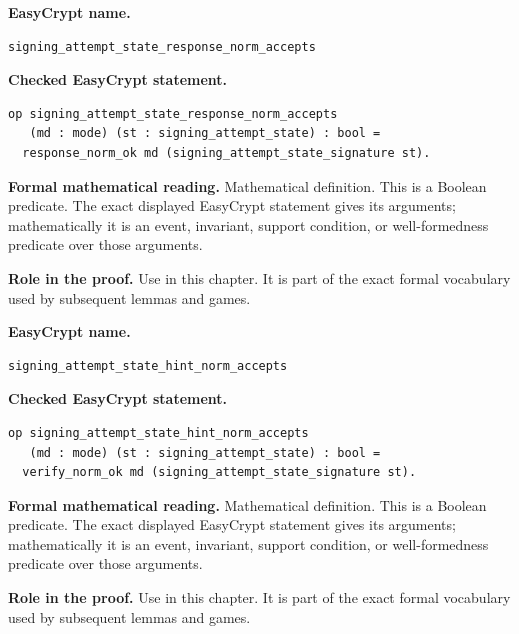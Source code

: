 \begin{formaldefinition}
\noindent\textbf{EasyCrypt name.}
\begin{lstlisting}[language=EasyCrypt,basicstyle=\ttfamily\scriptsize]
signing_attempt_state_response_norm_accepts
\end{lstlisting}
\noindent\textbf{Checked EasyCrypt statement.}
\begin{lstlisting}[language=EasyCrypt,basicstyle=\ttfamily\scriptsize]
op signing_attempt_state_response_norm_accepts
   (md : mode) (st : signing_attempt_state) : bool =
  response_norm_ok md (signing_attempt_state_signature st).
\end{lstlisting}
\noindent\textbf{Formal mathematical reading.}
Mathematical definition. This is a Boolean predicate.  The exact displayed EasyCrypt statement gives its arguments; mathematically it is an event, invariant, support condition, or well-formedness predicate over those arguments.

\noindent\textbf{Role in the proof.}
Use in this chapter. It is part of the exact formal vocabulary used by subsequent lemmas and games.

\end{formaldefinition}

\begin{formaldefinition}
\noindent\textbf{EasyCrypt name.}
\begin{lstlisting}[language=EasyCrypt,basicstyle=\ttfamily\scriptsize]
signing_attempt_state_hint_norm_accepts
\end{lstlisting}
\noindent\textbf{Checked EasyCrypt statement.}
\begin{lstlisting}[language=EasyCrypt,basicstyle=\ttfamily\scriptsize]
op signing_attempt_state_hint_norm_accepts
   (md : mode) (st : signing_attempt_state) : bool =
  verify_norm_ok md (signing_attempt_state_signature st).
\end{lstlisting}
\noindent\textbf{Formal mathematical reading.}
Mathematical definition. This is a Boolean predicate.  The exact displayed EasyCrypt statement gives its arguments; mathematically it is an event, invariant, support condition, or well-formedness predicate over those arguments.

\noindent\textbf{Role in the proof.}
Use in this chapter. It is part of the exact formal vocabulary used by subsequent lemmas and games.

\end{formaldefinition}

